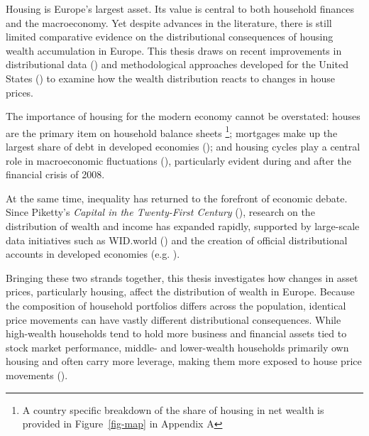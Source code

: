 \documentclass[
  a4paper,
  DIV=11,
  numbers=noendperiod]{scrartcl}
\begin{document}
Housing is Europe's largest asset. Its value is central to both
household finances and the macroeconomy. Yet despite advances in the
literature, there is still limited comparative evidence on the
distributional consequences of housing wealth accumulation in Europe.
This thesis draws on recent improvements in distributional data
() and methodological approaches developed for the United States
() to examine how the wealth distribution reacts to changes
in house prices.

The importance of housing for the modern economy cannot be overstated:
houses are the primary item on household balance sheets \footnote{A
  country specific breakdown of the share of housing in net wealth is
  provided in Figure~\ref{fig-map} in Appendix A}; mortgages make up the
largest share of debt in developed economies
(); and housing cycles play a central role in macroeconomic
fluctuations
(), particularly evident during and after the financial crisis of
2008.

At the same time, inequality has returned to the forefront of economic
debate. Since Piketty's \emph{Capital in the Twenty-First Century}
(),
research on the distribution of wealth and income has expanded rapidly,
supported by large-scale data initiatives such as WID.world
() and the creation of official distributional accounts in developed
economies (e.g.
).

Bringing these two strands together, this thesis investigates how
changes in asset prices, particularly housing, affect the distribution
of wealth in Europe. Because the composition of household portfolios
differs across the population, identical price movements can have vastly
different distributional consequences. While high-wealth households tend
to hold more business and financial assets tied to stock market
performance, middle- and lower-wealth households primarily own housing
and often carry more leverage, making them more exposed to house price
movements ().
\end{document}
